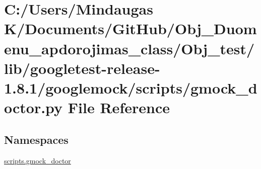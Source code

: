 \hypertarget{_obj__test_2lib_2googletest-release-1_88_81_2googlemock_2scripts_2gmock__doctor_8py}{}\section{C\+:/\+Users/\+Mindaugas K/\+Documents/\+Git\+Hub/\+Obj\+\_\+\+Duomenu\+\_\+apdorojimas\+\_\+class/\+Obj\+\_\+test/lib/googletest-\/release-\/1.8.1/googlemock/scripts/gmock\+\_\+doctor.py File Reference}
\label{_obj__test_2lib_2googletest-release-1_88_81_2googlemock_2scripts_2gmock__doctor_8py}
\subsection*{Namespaces}
\begin{DoxyCompactItemize}
\item 
 \mbox{\hyperlink{namespacescripts_1_1gmock__doctor}{scripts.\+gmock\+\_\+doctor}}
\end{DoxyCompactItemize}
